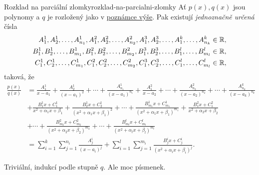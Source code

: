 \begin{theorem}{Rozklad na parciální zlomky}{rozklad-na-parcialni-zlomky}
 Ať $p(x),q(x)$ jsou polynomy a $q$ je rozložený jako v
 \hyperref[rmrk:rozklad-realneho-polynomu]{poznámce výše}. Pak existují
 \emph{jednoznačně určená} čísla
 \begin{align*}
  A_1^{1},A_2^{1},\ldots,A_{n_1}^{1},A_1^{2},A_2^{2},\ldots,A_{n_2}^{2},A_1^{3},A_2^{3},\ldots,A_{1}^{k},\ldots,A_{n_k}^{k}
  & \in \mathbb{R},\\
  B_1^{1},B_2^{1},\ldots,B_{m_1}^{1},B_1^{2},B_2^{2},\ldots,B_{m_2}^{2},B_1^{3},B_2^{3},\ldots,B_{1}^l,\ldots,B_{m_l}^{l}
  & \in \mathbb{R},\\
  C_1^{1},C_2^{1},\ldots,C_{m_1}^{1},C_1^{2},C_2^{2},\ldots,C_{m_2}^{2},C_1^{3},C_2^{3},\ldots,C_{1}^l,\ldots,C_{m_l}^{l}
  & \in \mathbb{R},
 \end{align*}
 taková, že
 \begin{align*}
  \frac{p(x)}{q(x)} &= \frac{A^{1}_1}{x - a_1} + \frac{A_2^{1}}{(x - a_1)^2} +
  \cdots + \frac{A_{n_1}^{1}}{(x-a_1)^{n_1}} + \frac{A_1^{2}}{x-a_2} + \cdots +
  \frac{A_{n_2}^{2}}{(x-a_2)^{n_2}} + \cdots +
  \frac{A_{n_k}^{k}}{(x-a_k)^{n_k}}\\
  &+ \frac{B_1^{1}x + C_1^{1}}{x^2 + \alpha_1x + \beta_1} + \frac{B_2^{1}x +
  C_2^{1}}{(x^2 + \alpha_1x + \beta_1)^2} + \cdots + \frac{B_{m_1}^{1}x +
  C^{1}_{m_1}}{(x^2 + \alpha_1x + \beta_1)^{m_1}} + \frac{B_1^{2}x +
  C_1^{2}}{x^2 + \alpha_2x + \beta_2}\\
  &+ \cdots + \frac{B_{m_2}^{2}x + C_{m_2}^{2}}{(x^2 + \alpha_2 x +
  \beta_2)^{m_2}} + \cdots + \frac{B_{m_l}^{l}x + C_{m_l}^{l}}{(x^2 + \alpha_l x
  + \beta_l)^{m_l}}\\
  &= \sum_{i=1}^k \sum_{j=1}^{n_i} \frac{A_j^{i}}{(x - a_i)^{j}} + \sum_{i=1}^l
  \sum_{j=1}^{m_i} \frac{B_j^{i}x + C_j^{i}}{(x^2 + \alpha_i x + \beta_i)^{j}}.
 \end{align*}
\end{theorem}
\begin{thmproof}
 Triviální, indukcí podle stupně $q$. Ale moc písmenek.
\end{thmproof}

